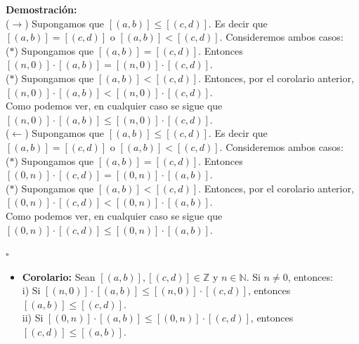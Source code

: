 \documentclass[10 pt]{article}
\begin{document}
\Large{\textbf{Demostración:} \\

($\rightarrow$) Supongamos que $[(a,b)] \leq [(c,d)]$. Es decir que $[(a,b)]=[(c,d)]$ o $[(a,b)]<[(c,d)]$. Consideremos ambos casos: \\

($\ast$) Supongamos que $[(a,b)]=[(c,d)]$. Entonces $[(n,0)] \cdot [(a,b)]=[(n,0)] \cdot [(c,d)]$. \\

($\ast$) Supongamos que $[(a,b)]<[(c,d)]$. Entonces, por el corolario anterior, $[(n,0)] \cdot [(a,b)]<[(n,0)] \cdot [(c,d)]$. \\

Como podemos ver, en cualquier caso se sigue que $[(n,0)] \cdot [(a,b)] \leq [(n,0)] \cdot [(c,d)]$. \\

($\leftarrow$) Supongamos que $[(a,b)] \leq [(c,d)]$. Es decir que $[(a,b)]=[(c,d)]$ o $[(a,b)]<[(c,d)]$. Consideremos ambos casos: \\

($\ast$) Supongamos que $[(a,b)]=[(c,d)]$. Entonces $[(0,n)] \cdot [(c,d)]=[(0,n)] \cdot [(a,b)]$. \\

($\ast$) Supongamos que $[(a,b)]<[(c,d)]$. Entonces, por el corolario anterior, $[(0,n)] \cdot [(c,d)]<[(0,n)] \cdot [(a,b)]$. \\

Como podemos ver, en cualquier caso se sigue que $[(0,n)] \cdot [(c,d)] \leq [(0,n)] \cdot [(a,b)]$.}\\

\begin{flushright}
    $\square$
\end{flushright}

\begin{itemize}
    \item \Large{\textbf{Corolario:} Sean $[(a,b)],[(c,d)] \in \mathbb Z$ y $n \in \mathbb N$. Si $n \neq 0$, entonces: \\

    i) Si $[(n,0)] \cdot [(a,b)] \leq [(n,0)] \cdot [(c,d)]$, entonces $[(a,b)] \leq [(c,d)]$. \\

    ii) Si $[(0,n)] \cdot [(a,b)] \leq [(0,n)] \cdot [(c,d)]$, entonces $[(c,d)] \leq [(a,b)]$.} \\
\end{itemize}
\end{document}
